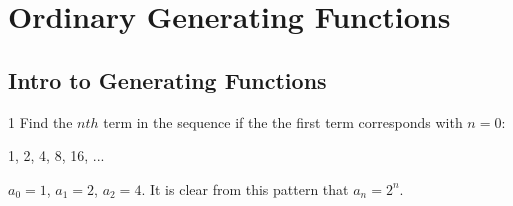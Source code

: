 \label{13-0304-2}

% 





% 




\section{Ordinary Generating Functions}

\subsection{Intro to Generating Functions}
\begin{problem}
    1 Find the $nth$ term in the sequence if the the first term corresponds with $n=0$:
     \begin{center} 1, 2, 4, 8, 16, ...\end{center}
      \end{problem}
\begin{solution}
$a_{0} = 1$, $a_{1} = 2$, $a_{2} = 4$. It is clear from this pattern that $a_{n} = 2^{n}$. 
\end{solution}

